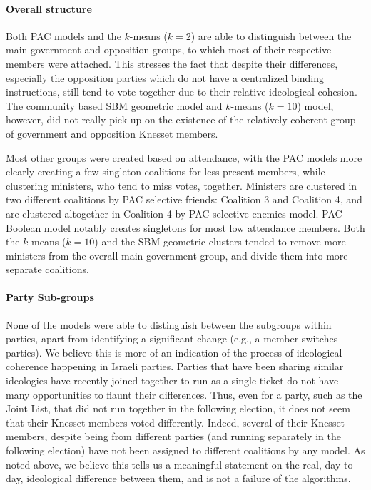 \paragraph{Overall structure}
Both PAC models and the $k$-means ($k=2$) are able to distinguish between the
main government and opposition groups, to which most
of their respective members were attached.
This stresses the fact that despite their differences, especially the opposition
parties which do not have a centralized binding instructions, still tend to
vote together due to their relative ideological cohesion.
The community based SBM geometric model and $k$-means ($k=10$) model, however,
did not really pick up on the existence of the relatively coherent group of
government and opposition Knesset members.

Most other groups were created based on attendance, with the PAC models more
clearly creating a few singleton coalitions for less present members, while
clustering ministers, who tend to miss votes, together.
Ministers are clustered in two different coalitions by PAC selective friends:
Coalition 3 and Coalition 4, and are clustered altogether in Coalition 4 by PAC selective
enemies model.
PAC Boolean model notably creates singletons for most low attendance members.
Both the $k$-means ($k=10$) and the SBM geometric clusters tended to remove
more ministers from the overall main government group, and divide them into
more separate coalitions.

\paragraph{Party Sub-groups}
None of the models were able to distinguish between the subgroups within
parties, apart from identifying a significant change (e.g., a member switches
parties).
We believe this is more of an indication of the process of ideological
coherence happening in Israeli parties.
Parties that have been sharing similar ideologies have recently joined together to run as a single ticket do not have many opportunities to flaunt their differences.
Thus, even for a party, such as the Joint List, that did not run together in
the following election, it does not seem that their Knesset members voted
differently.
Indeed, several of their Knesset members, despite being from different parties
(and running separately in the following election) have not been assigned to
different coalitions by any model.
As noted above, we believe this tells us a meaningful statement on the real,
day to day, ideological difference between them, and is not a failure of the
algorithms.

